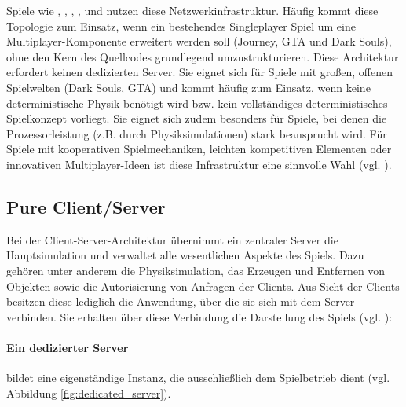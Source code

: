 Spiele wie , , , ,  und  nutzen diese Netzwerkinfrastruktur. Häufig kommt diese Topologie zum Einsatz, wenn ein bestehendes Singleplayer Spiel um eine Multiplayer-Komponente erweitert werden soll (Journey, GTA und Dark Souls), ohne den Kern des Quellcodes grundlegend umzustrukturieren. Diese Architektur erfordert keinen dedizierten Server. Sie eignet sich für Spiele mit großen, offenen Spielwelten (Dark Souls, GTA) und kommt häufig zum Einsatz, wenn keine deterministische Physik benötigt wird bzw. kein vollständiges deterministisches Spielkonzept vorliegt. Sie eignet sich zudem besonders für Spiele, bei denen die Prozessorleistung (z.B. durch Physiksimulationen) stark beansprucht wird. Für Spiele mit kooperativen Spielmechaniken, leichten kompetitiven Elementen oder innovativen Multiplayer-Ideen ist diese Infrastruktur eine sinnvolle Wahl (vgl. \citealp{fiedler_choosing_2024}).

\subsection{Pure Client/Server}
Bei der Client-Server-Architektur übernimmt ein zentraler Server die Hauptsimulation und verwaltet alle wesentlichen Aspekte des Spiels. Dazu gehören unter anderem die Physiksimulation, das Erzeugen und Entfernen von Objekten sowie die Autorisierung von Anfragen der Clients. Aus Sicht der Clients besitzen diese lediglich die Anwendung, über die sie sich mit dem Server verbinden. Sie erhalten über diese Verbindung die Darstellung des Spiels (vgl. \citealp{cooper_client-server_2025}):
\paragraph{Ein dedizierter Server} bildet eine eigenständige Instanz, die ausschließlich dem Spielbetrieb dient (vgl. Abbildung \ref{fig:dedicated_server}).

